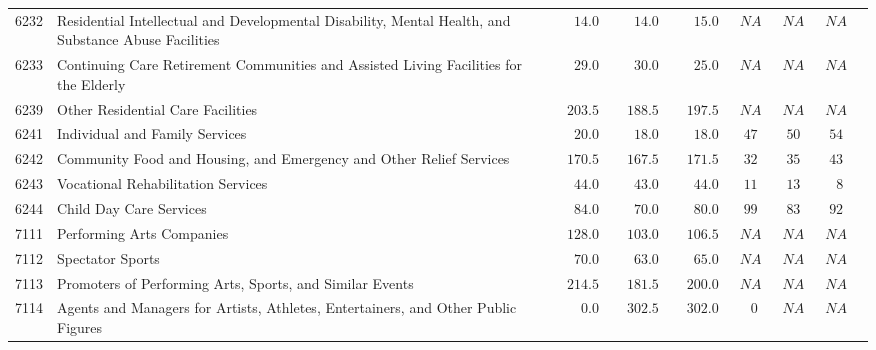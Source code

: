 \documentclass[9pt, oneside]{article}   	%
\begin{document}
\begin{longtable}{lp{3.5 in}ccccccc}
6232  & Residential Intellectual and Developmental Disability, Mental Health, and Substance Abuse Facilities & $\phantom{000}14.0$ & $\phantom{000}14.0$ & $\phantom{000}15.0$ & $\phantom{0}NA$ & $\phantom{0}NA$ & $\phantom{0}NA$ \\
6233  & Continuing Care Retirement Communities and Assisted Living Facilities for the Elderly & $\phantom{000}29.0$ & $\phantom{000}30.0$ & $\phantom{000}25.0$ & $\phantom{0}NA$ & $\phantom{0}NA$ & $\phantom{0}NA$ \\
6239  & Other Residential Care Facilities & $\phantom{00}203.5$ & $\phantom{00}188.5$ & $\phantom{00}197.5$ & $\phantom{0}NA$ & $\phantom{0}NA$ & $\phantom{0}NA$ \\
6241  & Individual and Family Services & $\phantom{000}20.0$ & $\phantom{000}18.0$ & $\phantom{000}18.0$ & $\phantom{0}47$ & $\phantom{0}50$ & $\phantom{0}54$ \\
6242  & Community Food and Housing, and Emergency and Other Relief Services & $\phantom{00}170.5$ & $\phantom{00}167.5$ & $\phantom{00}171.5$ & $\phantom{0}32$ & $\phantom{0}35$ & $\phantom{0}43$ \\
6243  & Vocational Rehabilitation Services & $\phantom{000}44.0$ & $\phantom{000}43.0$ & $\phantom{000}44.0$ & $\phantom{0}11$ & $\phantom{0}13$ & $\phantom{00}8$ \\
6244  & Child Day Care Services & $\phantom{000}84.0$ & $\phantom{000}70.0$ & $\phantom{000}80.0$ & $\phantom{0}99$ & $\phantom{0}83$ & $\phantom{0}92$ \\
7111  & Performing Arts Companies & $\phantom{00}128.0$ & $\phantom{00}103.0$ & $\phantom{00}106.5$ & $\phantom{0}NA$ & $\phantom{0}NA$ & $\phantom{0}NA$ \\
7112  & Spectator Sports & $\phantom{000}70.0$ & $\phantom{000}63.0$ & $\phantom{000}65.0$ & $\phantom{0}NA$ & $\phantom{0}NA$ & $\phantom{0}NA$ \\
7113  & Promoters of Performing Arts, Sports, and Similar Events & $\phantom{00}214.5$ & $\phantom{00}181.5$ & $\phantom{00}200.0$ & $\phantom{0}NA$ & $\phantom{0}NA$ & $\phantom{0}NA$ \\
7114  & Agents and Managers for Artists, Athletes, Entertainers, and Other Public Figures & $\phantom{0000}0.0$ & $\phantom{00}302.5$ & $\phantom{00}302.0$ & $\phantom{00}0$ & $\phantom{0}NA$ & $\phantom{0}NA$ \\

\end{longtable}
\end{document}
